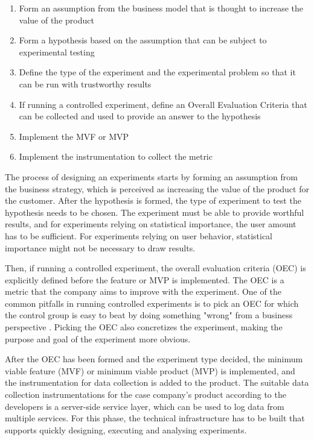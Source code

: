 \documentclass[english]{tktltiki2}
\theoremstyle{definition}
\theoremstyle{remark}
\begin{document}
\begin{enumerate}
  \item Form an assumption from the business model that is thought to increase the value of the product
  \item Form a hypothesis based on the assumption that can be subject to experimental testing 
  \item Define the type of the experiment and the experimental problem so that it can be run with trustworthy results
  \item If running a controlled experiment, define an Overall Evaluation Criteria that can be collected and used to provide an answer to the hypothesis  
  \item Implement the MVF or MVP
  \item Implement the instrumentation to collect the metric
\end{enumerate}

The process of designing an experiments starts by forming an assumption from the business strategy, which is perceived as increasing the value of the product for the customer. After the hypothesis is formed, the type of experiment to test the hypothesis needs to be chosen. The experiment must be able to provide worthful results, and for experiments relying on statistical importance, the user amount has to be sufficient. For experiments relying on user behavior, statistical importance might not be necessary to draw results.

Then, if running a controlled experiment, the overall evaluation criteria (OEC) is explicitly defined before the feature or MVP is implemented. The OEC is a metric that the company aims to improve with the experiment. One of the common pitfalls in running controlled experiments is to pick an OEC for which the control group is easy to beat by doing something "wrong" from a business perspective \cite{crook2009seven}. Picking the OEC also concretizes the experiment, making the purpose and goal of the experiment more obvious. 

After the OEC has been formed and the experiment type decided, the minimum viable feature (MVF) or minimum viable product (MVP) is implemented, and the instrumentation for data collection is added to the product. The suitable data collection instrumentations for the case company's product according to the developers is a server-side service layer, which can be used to log data from multiple services. For this phase, the technical infrastructure has to be built that supports quickly designing, executing and analysing experiments.  
\end{document}
